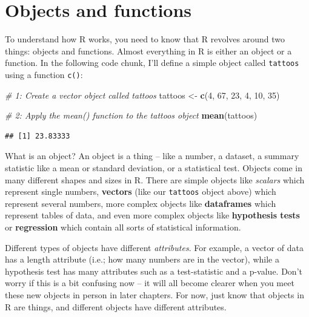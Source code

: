 \documentclass[
]{book}
\newenvironment{Shaded}{\begin{snugshade}}{\end{snugshade}}
\newcommand{\CommentTok}[1]{\textcolor[rgb]{0.56,0.35,0.01}{\textit{#1}}}
\newcommand{\DecValTok}[1]{\textcolor[rgb]{0.00,0.00,0.81}{#1}}
\newcommand{\KeywordTok}[1]{\textcolor[rgb]{0.13,0.29,0.53}{\textbf{#1}}}
\newcommand{\NormalTok}[1]{#1}
\newcommand{\StringTok}[1]{\textcolor[rgb]{0.31,0.60,0.02}{#1}}
\begin{document}
\hypertarget{objects-and-functions}{%
\section{Objects and functions}\label{objects-and-functions}}

To understand how R works, you need to know that R revolves around two things: objects and functions. Almost everything in R is either an object or a function. In the following code chunk, I'll define a simple object called \texttt{tattoos} using a function \texttt{c()}:

\begin{Shaded}
\begin{Highlighting}[]
\CommentTok{# 1: Create a vector object called tattoos}
\NormalTok{tattoos <-}\StringTok{ }\KeywordTok{c}\NormalTok{(}\DecValTok{4}\NormalTok{, }\DecValTok{67}\NormalTok{, }\DecValTok{23}\NormalTok{, }\DecValTok{4}\NormalTok{, }\DecValTok{10}\NormalTok{, }\DecValTok{35}\NormalTok{)}

\CommentTok{# 2: Apply the mean() function to the tattoos object}
\KeywordTok{mean}\NormalTok{(tattoos)}
\end{Highlighting}
\end{Shaded}

\begin{verbatim}
## [1] 23.83333
\end{verbatim}

What is an object? An object is a thing -- like a number, a dataset, a summary statistic like a mean or standard deviation, or a statistical test. Objects come in many different shapes and sizes in R. There are simple objects like \textit{scalars} which represent single numbers, \textbf{vectors} (like our \texttt{tattoos} object above) which represent several numbers, more complex objects like \textbf{dataframes} which represent tables of data, and even more complex objects like \textbf{hypothesis tests} or \textbf{regression} which contain all sorts of statistical information.

Different types of objects have different \emph{attributes}. For example, a vector of data has a length attribute (i.e.; how many numbers are in the vector), while a hypothesis test has many attributes such as a test-statistic and a p-value. Don't worry if this is a bit confusing now -- it will all become clearer when you meet these new objects in person in later chapters. For now, just know that objects in R are things, and different objects have different attributes.
\end{document}

